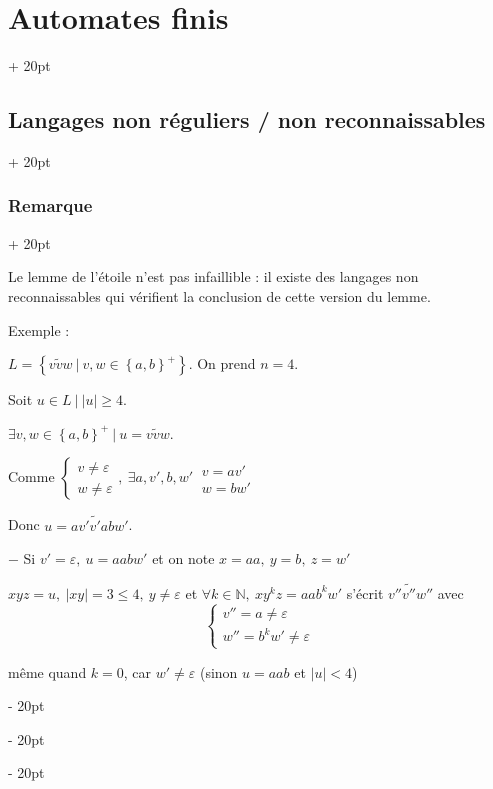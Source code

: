 \documentclass[a4paper, 12pt, twoside]{article}
\newcommand{\N}{\mathbb{N}} %
\newcommand{\set}[1]{\left\{ #1 \right\}}
\newcommand{\abs}[1]{\left\lvert #1 \right\rvert}
\renewcommand{\le}{\leqslant}
\renewcommand{\ge}{\geqslant}
\newcommand{\ind}[1][20pt]{\advance\leftskip + #1}
\newcommand{\deind}[1][20pt]{\advance\leftskip - #1}
\newenvironment{indt}[2][20pt]{#2 \par \ind[#1]}{\par \deind} %
\begin{document}
\begin{indt}{\section{Automates finis}}
\begin{indt}{\subsection{Langages non réguliers / non reconnaissables}}
\begin{indt}{\subsubsection{Remarque}}
                \vspace{6pt}
                
                Le lemme de l'étoile n'est pas infaillible : il existe des langages non reconnaissables qui vérifient la conclusion de cette version du lemme.

                \vspace{12pt}
                
                Exemple :

                $L = \set{v \widetilde v w\ |\ v, w \in \set{a, b}^+}$.
                On prend $n = 4$.

                Soit $u \in L\ |\ \abs u \ge 4$.

                $\exists v, w \in \set{a, b}^+\ |\ u = v \widetilde v w$.

                Comme $
                    \begin{cases}
                        v \neq \varepsilon
                        \\
                        w \neq \varepsilon
                    \end{cases},\
                    \exists a, v', b, w'\
                    \begin{array}{|l}
                        v = av'
                        \\
                        w = bw'
                    \end{array}
                $

                Donc $u = av' \widetilde{v'} abw'$.

                $-$ Si $v' = \varepsilon,\ u = aabw'$ et on note $x = aa,\ y = b,\ z = w'$

                $xyz = u,\ \abs{xy} = 3 \le 4, \ y \neq \varepsilon$ et $ \forall k \in \N,\ xy^kz = aab^kw'$ s'écrit $v'' \widetilde{v''} w''$ avec
                \[
                    \begin{cases}
                        v'' = a \neq \varepsilon
                        \\
                        w'' = b^k w' \neq \varepsilon
                    \end{cases}
                \]

                même quand $k = 0$, car $w' \neq \varepsilon$ (sinon $u = aab$ et $\abs u < 4$)

                \vspace{6pt}
                

\end{indt}
\end{indt}
\end{indt}
\end{document}
